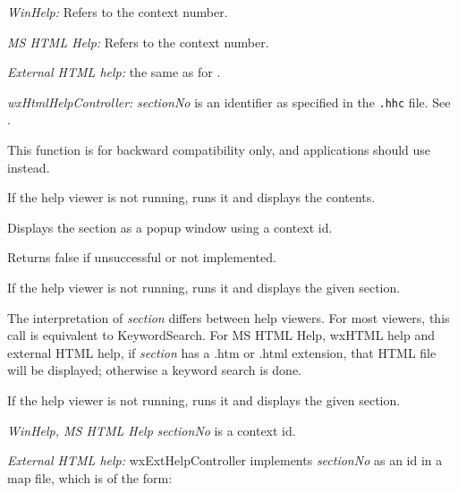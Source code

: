 {\it WinHelp:} Refers to the context number.

{\it MS HTML Help:} Refers to the context number.

{\it External HTML help:} the same as for .

{\it wxHtmlHelpController:} {\it sectionNo} is an identifier as specified in the {\tt .hhc} file. See .

This function is for backward compatibility only, and applications should use  instead.

\label{wxhelpcontrollerdisplaycontents}


If the help viewer is not running, runs it and displays the
contents.

\label{wxhelpcontrollerdisplaycontextpopup}


Displays the section as a popup window using a context id.

Returns false if unsuccessful or not implemented.

\label{wxhelpcontrollerdisplaysection}


If the help viewer is not running, runs it and displays the given section.

The interpretation of {\it section} differs between help viewers. For most viewers,
this call is equivalent to KeywordSearch. For MS HTML Help, wxHTML help and external HTML help,
if {\it section} has a .htm
or .html extension, that HTML file will be displayed; otherwise
a keyword search is done.


If the help viewer is not running, runs it and displays the given section.

{\it WinHelp, MS HTML Help} {\it sectionNo} is a context id.

{\it External HTML help:} wxExtHelpController implements {\it sectionNo} as an id in a map file, which is of the form:

